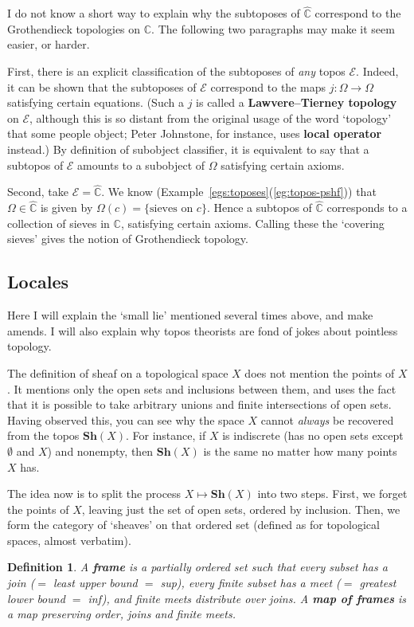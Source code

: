 \documentclass{article}
\newcommand{\cat}[1]{\mathscr{#1}}
\newcommand{\fcat}[1]{\mathbf{#1}}
\newcommand{\goesto}{\mapsto}
\newcommand{\demph}[1]{\textbf{\textup{#1}}}
\newcommand{\scat}[1]{\mathbb{#1}}
\newcommand{\chunk}[1]{\subsection*{#1}}
\newcommand{\E}{\cat{E}}
\newcommand{\Psh}[1]{\widehat{#1}}
\newcommand{\Sh}{\fcat{Sh}}
\newcommand{\cln}{\colon}
\newtheorem{predefn}[thm]{Definition}
\newenvironment{defn}{\begin{predefn}\upshape}{\end{predefn}}
\begin{document}
I do not know a short way to explain why the subtoposes of $\Psh{\scat{C}}$
correspond to the Grothendieck topologies on $\scat{C}$.  The following two
paragraphs may make it seem easier, or harder.

First, there is an explicit classification of the subtoposes of \emph{any}
topos $\E$.  Indeed, it can be shown that the subtoposes of $\E$ correspond to
the maps $j\cln \Omega \to \Omega$ satisfying certain equations.  
(Such a $j$ is called a \demph{Lawvere--Tierney topology} on $\E$, although
this is so distant from the original usage of the word `topology' that some
people object; Peter Johnstone, for instance, uses \demph{local operator}
instead.)  By definition of subobject classifier, it is equivalent to say that
a subtopos of $\E$ amounts to a subobject of $\Omega$ satisfying certain
axioms.

Second, take $\E = \Psh{\scat{C}}$.  We know
(Example~\ref{egs:toposes}(\ref{eg:topos-pshf})) that $\Omega \in
\Psh{\scat{C}}$ is given by $\Omega(c) = \{ \text{sieves on } c \}$.  Hence a
subtopos of $\Psh{\scat{C}}$ corresponds to a collection of sieves in
$\scat{C}$, satisfying certain axioms.  Calling these the `covering sieves'
gives the notion of Grothendieck topology.


\chunk{Locales}


Here I will explain the `small lie' mentioned several times above, and make
amends.  I will also explain why topos theorists are fond of jokes about
pointless topology.

The definition of sheaf on a topological space $X$ does not mention the points
of $X$.  It mentions only the open sets and inclusions between them, and uses
the fact that it is possible to take arbitrary unions and finite intersections
of open sets.  Having observed this, you can see why the space $X$ cannot
\emph{always} be recovered from the topos $\Sh(X)$.  For instance, if $X$ is
indiscrete (has no open sets except $\emptyset$ and $X$) and nonempty, then
$\Sh(X)$ is the same no matter how many points $X$ has.

The idea now is to split the process $X \goesto \Sh(X)$ into two steps.  First,
we forget the points of $X$, leaving just the set of open sets, ordered by
inclusion.  Then, we form the category of `sheaves' on that ordered set
(defined as for topological spaces, almost verbatim).

\begin{defn}
A \demph{frame} is a partially ordered set such that every subset has a join
($=$ least upper bound $=$ sup), every finite subset has a meet ($=$ greatest
lower bound $=$ inf), and finite meets distribute over joins.  A \demph{map of
frames} is a map preserving order, joins and finite meets.
\end{defn}
\end{document}
